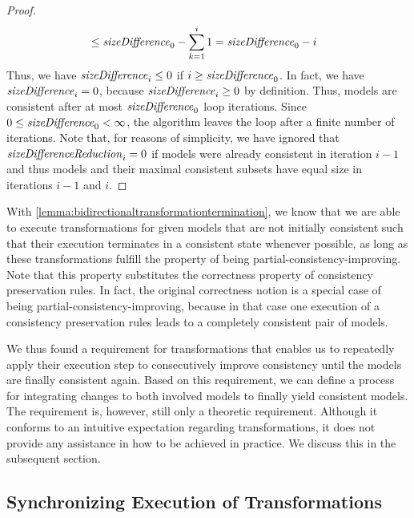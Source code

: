 \begin{proof}
\begin{align*}
        &
        \leq \mathit{sizeDifference}_{0} - \sum_{k=1}^{i} 1 = \mathit{sizeDifference}_{0} - i
    \end{align*}
    Thus, we have $\mathit{sizeDifference}_{i} \leq 0$ if $i \geq \mathit{sizeDifference}_{0}$.
    In fact, we have $\mathit{sizeDifference}_{i} = 0$, because $\mathit{sizeDifference}_{i} \geq 0$ by definition.
    Thus, models are consistent after at most $\mathit{sizeDifference}_{0}$ loop iterations.
    Since $0 \leq \mathit{sizeDifference}_{0} < \infty$, the algorithm leaves the loop after a finite number of iterations.
    Note that, for reasons of simplicity, we have ignored that $\mathit{sizeDifferenceReduction}_{i} = 0$ if models were already consistent in iteration $i-1$ and thus models and their maximal consistent subsets have equal size in iterations $i-1$ and $i$.
\end{proof}

With \autoref{lemma:bidirectionaltransformationtermination}, we know that we are able to execute transformations for given models that are not initially consistent such that their execution terminates in a consistent state whenever possible, as long as these transformations fulfill the property of being partial-consistency-improving.
Note that this property substitutes the correctness property of consistency preservation rules.
In fact, the original correctness notion is a special case of being partial-consistency-improving, because in that case one execution of a consistency preservation rules leads to a completely consistent pair of models.

We thus found a requirement for transformations that enables us to repeatedly apply their execution step to consecutively improve consistency until the models are finally consistent again.
Based on this requirement, we can define a process for integrating changes to both involved models to finally yield consistent models.
The requirement is, however, still only a theoretic requirement. 
Although it conforms to an intuitive expectation regarding transformations, it does not provide any assistance in how to be achieved in practice. We discuss this in the subsequent section.


\subsection{Synchronizing Execution of Transformations}
\label{chap:synchronization:bidirectional:execution}

